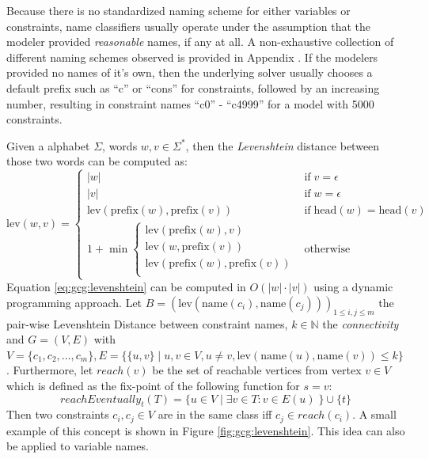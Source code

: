 			\clearpage
			
			Because there is no standardized naming scheme for either variables or constraints, name classifiers usually operate under the assumption that the modeler provided \textit{reasonable} names, if any at all.
			A non-exhaustive collection of different naming schemes observed is provided in Appendix .
			If the modelers provided no names of it's own, then the underlying solver usually chooses a default prefix such as \enquote{c} or \enquote{cons} for constraints, followed by an increasing number, resulting in constraint names \enquote{c0} - \enquote{c4999} for a model with 5000 constraints.
			
			Given a alphabet $\Sigma$, words $w, v \in \Sigma^*$, then the \textit{Levenshtein} distance between those two words can be computed as:
			\begin{equation}
				\label{eq:gcg:levenshtein}
				\mathrm{lev}(w, v) = \begin{cases}
					|w| & \mathrm{if} \; v = \epsilon \\
					|v| & \mathrm{if} \; w = \epsilon \\
					\mathrm{lev}(\mathrm{prefix}(w), \mathrm{prefix}(v)) & \mathrm{if} \; \mathrm{head}(w) = \mathrm{head}(v) \\
					1 + \min \begin{cases}
						\mathrm{lev}(\mathrm{prefix}(w), v) \\
						\mathrm{lev}(w, \mathrm{prefix}(v)) \\
						\mathrm{lev}(\mathrm{prefix}(w), \mathrm{prefix}(v)) \\
					\end{cases} & \mathrm{otherwise}
				\end{cases}
			\end{equation}
			Equation \ref{eq:gcg:levenshtein} can be computed in $O(|w| \cdot |v|)$ using a dynamic programming approach.
			Let $B = (\mathrm{lev}(\mathrm{name}(c_i), \mathrm{name}(c_j)))_{1 \leq i,j \leq m}$ the pair-wise Levenshtein Distance between constraint names, $k \in \mathbb{N}$ the \textit{connectivity} and $G = (V, E)$ with $V = \{ c_1, c_2, \ldots, c_m \}, E = \{ \{ u, v \} \mid u, v \in V, u \neq v, \mathrm{lev}(\mathrm{name}(u), \mathrm{name}(v)) \leq k \}$.
			Furthermore, let $reach(v)$ be the set of reachable vertices from vertex $v \in V$ which is defined as the fix-point of the following function for $s = v$:
			\begin{equation*}
				{reachEventually}_t(T) = \{ u \in V \mid \exists v \in T: v \in E(u) \;  \} \cup \{ t \}
			\end{equation*}
			Then two constraints $c_i, c_j \in V$ are in the same class iff $c_j \in reach(c_i)$.
			A small example of this concept is shown in Figure \ref{fig:gcg:levenshtein}.
			This idea can also be applied to variable names.
			
